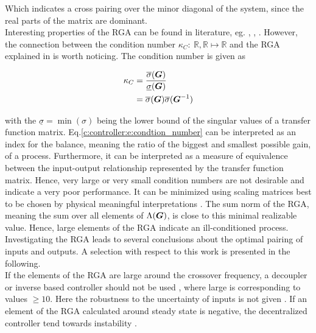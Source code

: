 Which indicates a cross pairing over the minor diagonal of the system, since the real parts of the matrix are dominant.\\

Interesting properties of the RGA can be found in literature, eg. \cite{Skogestad2005}, \cite{Astrom1995}, \cite{Astrom2006}. However, the connection between the condition number $\kappa_C:~\mathbb{R},\mathbb{R} \mapsto \mathbb{R}$ and the RGA explained in \cite[p.88 f.]{Skogestad2005} is worth noticing. The condition number is given as

\begin{align}
\begin{split}
\kappa_C &= \frac{\overline{\sigma}(\mbox{\boldmath$G$})}{\underline{\sigma}(\mbox{\boldmath$G$})} \\
&= \overline{\sigma}(\mbox{\boldmath$G$}) \overline{\sigma}(\mbox{\boldmath$G$}^{-1})
\end{split}
\label{c:controller:e:condtion_number}
\end{align}

with the $\underline{\sigma} = \min(\sigma)$ being the lower bound of the singular values of a transfer function matrix. Eq.\ref{c:controller:e:condtion_number} can be interpreted as an index for the balance, meaning the ratio of the biggest and smallest possible gain, of a process. Furthermore, it can be interpreted as a measure of equivalence between the input-output relationship represented by the transfer function matrix. Hence, very large or very small condition numbers are not desirable and indicate a very poor performance. It can be minimized using scaling matrices best to be chosen by physical meaningful interpretations \cite[p.87]{Skogestad2005}. The sum norm of the RGA, meaning the sum over all elements of $\Lambda(\mbox{\boldmath$G$})$, is close to this minimal realizable value. Hence, large elements of the RGA indicate an ill-conditioned process.\\ 

Investigating the RGA leads to several conclusions about the optimal pairing of inputs and outputs. A selection with respect to this work is presented in the following.\\

If the elements of the RGA are large around the crossover frequency, a decoupler or inverse based controller should not be used \cite[p. 89]{Skogestad2005}, where large is corresponding to values $\geq 10$. Here the robustness to the uncertainty of inputs is not given \cite[p.243]{Skogestad2005}. If an element of the RGA calculated around steady state is negative, the decentralized controller tend towards instability \cite[p.90, p.447]{Skogestad2005}. \pagebreak


